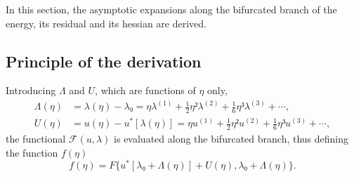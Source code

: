 \documentclass[12pt, final]{scrartcl}
\theoremstyle{definition}
\newcommand{\order}[2][1]{#2^{(#1)}}
\begin{document}
In this section, the asymptotic expansions along the bifurcated branch of the
energy, its residual and its hessian are derived.

\subsection{Principle of the derivation}
\label{sec:20220107121442}
%

Introducing $Λ$ and $U$, which are functions of $η$ only,
\begin{align}
  \label{eq:20211112155446}
  Λ(η) & = λ(η) - λ₀ = η \order[1]λ + \tfrac{1}{2} η² \order[2]λ + \tfrac{1}{6} η³ \order[3]λ + \cdots,\\
  \label{eq:20211112113028}
  U(η) & = u(η) - u^{\ast}[λ(η)] = η \order[1]u + \tfrac{1}{2} η² \order[2]u + \tfrac{1}{6} η³ \order[3]u + \cdots,
\end{align}
the functional $\mathcal{F}(u, λ)$ is evaluated along the bifurcated branch,
thus defining the function $f(η)$
\begin{equation*}
  f(η) = F\{ u^{\ast} [λ₀ + Λ(η)] + U(η), λ₀ + Λ(η) \}.
\end{equation*}
\end{document}
